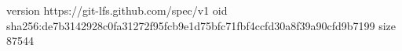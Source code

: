 version https://git-lfs.github.com/spec/v1
oid sha256:de7b3142928c0fa31272f95fcb9e1d75bfc71fbf4ccfd30a8f39a90cfd9b7199
size 87544
